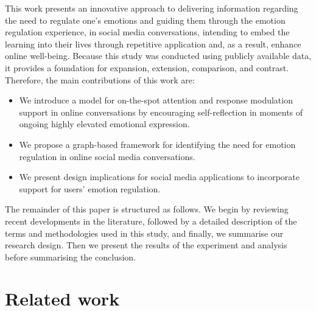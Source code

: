 \documentclass[acmtog]{acmart}
\begin{document}
This work presents an innovative approach to delivering information regarding the need to regulate one's emotions and guiding them through the emotion regulation experience, in social media conversations, intending to embed the learning into their lives through repetitive application and, as a result, enhance online well-being. Because this study was conducted using publicly available data, it provides a foundation for expansion, extension, comparison, and contrast. Therefore, the main contributions of this work are:
\begin{itemize}
    \item We introduce a model for on-the-spot attention and response modulation support in online conversations by encouraging self-reflection in moments of ongoing highly elevated emotional expression.
    \item We propose a graph-based framework for identifying the need for emotion regulation in online social media conversations.
    \item We present design implications for social media applications to incorporate support for users' emotion regulation.
\end{itemize}
The remainder of this paper is structured as follows. We begin by reviewing recent developments in the literature, followed by a detailed description of the terms and methodologies used in this study, and finally, we summarise our research design. Then we present the results of the experiment and analysis before summarising the conclusion.


\section{Related work}
\end{document}
